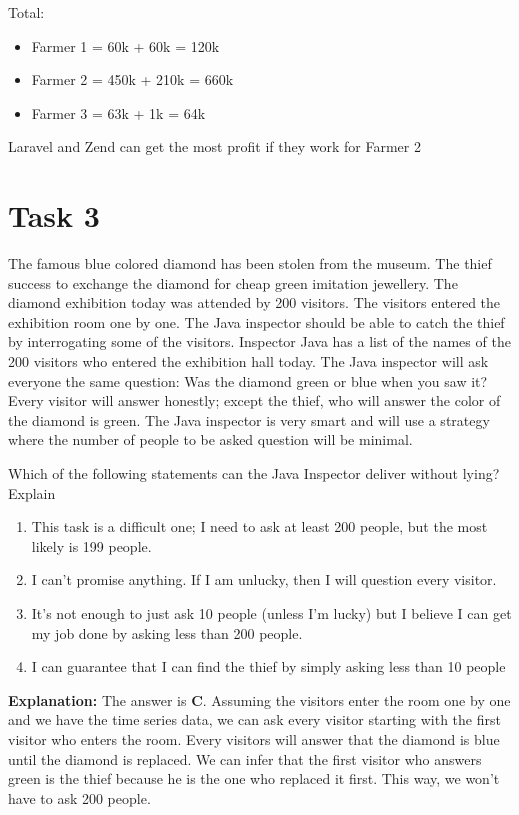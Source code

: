\documentclass[12pt,titlepage]{article}
\begin{document}
Total:
\begin{itemize}
    \item Farmer 1 = 60k + 60k = 120k
    \item Farmer 2 = 450k + 210k = 660k
    \item Farmer 3 = 63k + 1k = 64k
\end{itemize}

Laravel and Zend can get the most profit if they work for Farmer 2

\section*{Task 3}
The famous blue colored diamond has been stolen from the museum. The thief success to exchange the diamond for cheap
green imitation jewellery. The diamond exhibition today was attended by 200 visitors. The visitors entered the exhibition
room one by one. The Java inspector should be able to catch the thief by interrogating some of the visitors. Inspector Java
has a list of the names of the 200 visitors who entered the exhibition hall today. The Java inspector will ask everyone the
same question: Was the diamond green or blue when you saw it? Every visitor will answer honestly; except the thief, who
will answer the color of the diamond is green. The Java inspector is very smart and will use a strategy where the number
of people to be asked question will be minimal.

\pagebreak

Which of the following statements can the Java Inspector deliver without lying? Explain

\begin{enumerate}[label=\alph*)]
    \item This task is a difficult one; I need to ask at least 200 people, but the most likely is 199 people.
    \item I can't promise anything. If I am unlucky, then I will question every visitor.
    \item It's not enough to just ask 10 people (unless I'm lucky) but I believe I can get my job done by asking less than 200 people.
    \item I can guarantee that I can find the thief by simply asking less than 10 people
\end{enumerate}

\textbf{Explanation:} The answer is \textbf{C}. Assuming the visitors enter the room one by one and we have the time series data, we can ask every visitor starting with the first visitor who enters the room.
Every visitors will answer that the diamond is blue until the diamond is replaced.
We can infer that the first visitor who answers green is the thief because he is the one who replaced it first.
This way, we won't have to ask 200 people.
\end{document}
